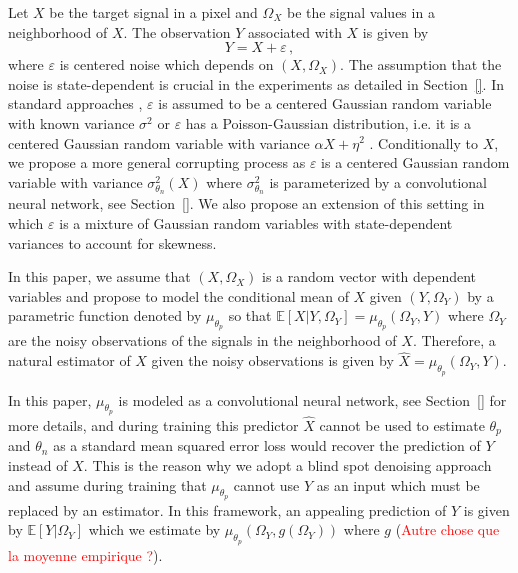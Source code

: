 \documentclass{article}
\begin{document}
Let $X$ be the target signal in a pixel and $\Omega_X$ be the signal values in a neighborhood of $X$.  The observation $Y$ associated with $X$  is given by
\begin{equation}
\label{eq:def:Y}
Y = X + \varepsilon\,,
\end{equation}
where $\varepsilon$ is centered noise which depends on $(X,\Omega_X)$. The assumption that the noise is state-dependent is crucial in the experiments as detailed in Section~\ref{}. In standard approaches \cite{},  $\varepsilon$ is assumed to be a centered Gaussian random variable with known variance $\sigma^2$ \cite{} or $\varepsilon$ has a Poisson-Gaussian distribution, i.e. it  is a centered Gaussian random variable with variance $\alpha X + \eta^2$ \cite{}.
Conditionally to $X$, we propose a more general corrupting process as $\varepsilon$ is a centered Gaussian random variable with variance $\sigma^2_{\theta_n}(X)$ where $\sigma^2_{\theta_n}$ is parameterized by a convolutional neural network, see Section~\ref{}. We also propose an extension of this setting in which $\varepsilon$ is a mixture of Gaussian random variables with state-dependent variances to account for skewness.

In this paper, we assume that $(X,\Omega_X)$ is a random vector with dependent variables and propose to model the conditional mean of $X$ given $(Y,\Omega_Y)$ by a parametric function denoted by $\mu_{\theta_p}$ so that $\mathbb{E}[X|Y,\Omega_Y] = \mu_{\theta_p}(\Omega_Y,Y)$ where $\Omega_Y$ are the noisy observations of the signals in the neighborhood of $X$. Therefore, a natural estimator of $X$ given the noisy observations is given by $\widehat X = \mu_{\theta_p}(\Omega_Y,Y)$.

In this paper, $\mu_{\theta_p}$ is modeled as a convolutional neural network, see Section~\ref{} for more details, and during training this predictor $\widehat X$ cannot be used to estimate $\theta_p$ and $\theta_n$ as  a standard mean squared error loss would recover the prediction of $Y$ instead of $X$. This is the reason why we adopt a blind spot denoising approach and assume during training that $\mu_{\theta_p}$ cannot use $Y$ as an input which must be replaced by an estimator. In this framework, an appealing prediction of $Y$ is given by $\mathbb{E}[Y|\Omega_Y]$ which we estimate by $\mu_{\theta_p}(\Omega_Y,g(\Omega_Y))$ where $g$ (\textcolor{red}{Autre chose que la moyenne empirique ?}).
\end{document}
